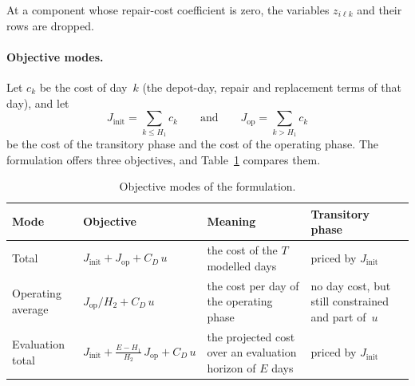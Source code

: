 \documentclass[11pt,a4paper]{article}
\theoremstyle{plain}
\theoremstyle{definition}
\theoremstyle{remark}
\begin{document}
At a component whose repair-cost coefficient is zero, the variables $z_{i\ell k}$ and their rows are dropped.

\paragraph{Objective modes.}
Let $c_k$ be the cost of day~$k$ (the depot-day, repair and replacement terms of that day), and let
\begin{equation}
  J_{\mathrm{init}} = \sum_{k \le H_1} c_k
  \qquad\text{and}\qquad
  J_{\mathrm{op}} = \sum_{k > H_1} c_k
\end{equation}
be the cost of the transitory phase and the cost of the operating phase.
The formulation offers three objectives, and Table~\ref{tab:objective_modes} compares them.

\begin{table}[htbp]
\centering
\caption{Objective modes of the formulation.}
\label{tab:objective_modes}
\small
\begin{tabularx}{\linewidth}{@{}>{\hsize=0.822\hsize\raggedright\arraybackslash}X>{\hsize=1.123\hsize\raggedright\arraybackslash}X>{\hsize=1.205\hsize\raggedright\arraybackslash}X>{\hsize=0.849\hsize\raggedright\arraybackslash}X@{}}
\toprule
\rowcolor{headgrey}
\textbf{Mode} & \textbf{Objective} & \textbf{Meaning} & \textbf{Transitory phase} \\
\midrule
Total             & $J_{\mathrm{init}} + J_{\mathrm{op}} + C_D\,u$ & the cost of the $T$ modelled days & priced by $J_{\mathrm{init}}$ \\
Operating average & $J_{\mathrm{op}}/H_2 + C_D\,u$ & the cost per day of the operating phase & no day cost, but still constrained and part of~$u$ \\
Evaluation total  & $J_{\mathrm{init}} + \frac{E - H_1}{H_2}\,J_{\mathrm{op}} + C_D\,u$ & the projected cost over an evaluation horizon of $E$ days & priced by $J_{\mathrm{init}}$ \\
\bottomrule
\end{tabularx}
\end{table}
\end{document}
